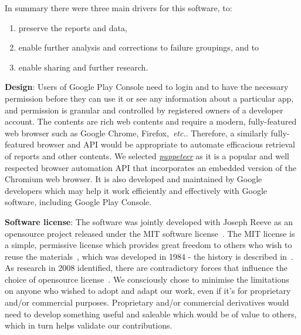 In summary there were three main drivers for this software, to:
\begin{enumerate}
    \item preserve the reports and data,
    \item enable further analysis and corrections to failure groupings, and to
    \item enable sharing and further research.
\end{enumerate}

\textbf{Design}:
Users of Google Play Console need to login and to have the necessary permission before they can use it or see any information about a particular app, and permission is granular and controlled by registered owners of a developer account. The contents are rich web contents and require a modern, fully-featured web browser such as Google Chrome, Firefox,~\emph{etc.}. Therefore, a similarly fully-featured browser and API would be appropriate to automate efficacious retrieval of reports and other contents. We selected \href{https://developers.google.com/web/tools/puppeteer}{\emph{puppeteer}} as it is a popular and well respected browser automation API that incorporates an embedded version of the Chromium web browser. It is also developed and maintained by Google developers which may help it work efficiently and effectively with Google software, including Google Play Console.

\textbf{Software license}: The software was jointly developed with Joseph Reeve as an opensource project released under the MIT software license~\citep{mitlicense2020_ongithub}. The MIT license is a simple, permissive license which provides great freedom to others who wish to reuse the materials~\citep{chooseanopensourcelicense2020}, which was developed in 1984 - the history is described in~\citep{saltzer2020_the_origin_of_the_mit_license}. As research in 2008 identified, there are contradictory forces that influence the choice of opensource license~\citep{sen2008_determinants_for_foss_license}. We consciously chose to minimise the limitations on anyone who wished to adopt and adapt our work, even if it's for proprietary and/or commercial purposes. Proprietary and/or commercial derivatives would need to develop something useful and saleable which would be of value to others, which in turn helps validate our contributions.  

